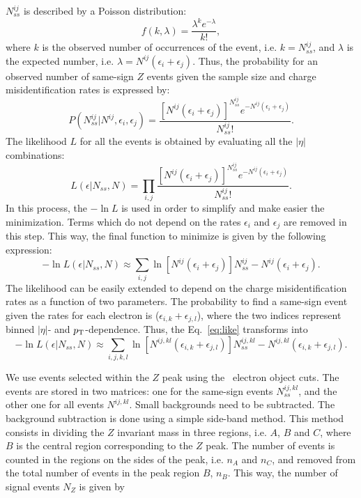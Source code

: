 $N^{ij}_{ss}$ is described by a Poisson distribution:
\begin{equation}
f(k,\lambda)=\frac{\lambda^k e^{-\lambda}}{k!},
\end{equation}
where $k$ is the observed number of occurrences of the event, i.e. $k=N^{ij}_{ss}$, and $\lambda$ is the expected number,  i.e. $\lambda=N^{ij}(\epsilon_i+\epsilon_j)$. Thus, the probability for an observed number of same-sign $Z$ events given the sample size and charge misidentification rates is expressed by:
\begin{equation}
P(N^{ij}_{ss}|N^{ij},\epsilon_i,\epsilon_j)=\frac{[N^{ij}(\epsilon_i+\epsilon_j)]^{N_{ss}^{ij}}e^{-N^{ij}(\epsilon_i+\epsilon_j)}}{N^{ij}_{ss}!}.
\end{equation}
The likelihood $L$ for all the events is obtained by evaluating all the $|\eta|$ combinations:
\begin{equation}
L(\epsilon|N_{ss},N)=\prod_{i,j}\frac{[N^{ij}(\epsilon_i+\epsilon_j)]^{N_{ss}^{ij}}e^{-N^{ij}(\epsilon_i+\epsilon_j)}}{N^{ij}_{ss}!}.
\end{equation}
In this process, the $-\ln L$ is used in order to simplify and make easier the minimization. Terms which do not depend on the rates $\epsilon_i$ and $\epsilon_j$ are removed in this step. This way, the final function to minimize is given by the following expression:
\begin{equation}
\label{eq:like}
-\ln L(\epsilon|N_{ss},N)\approx \sum_{i,j}\ln[N^{ij}(\epsilon_i+\epsilon_j)]N^{ij}_{ss}-N^{ij}(\epsilon_i+\epsilon_j).
\end{equation}
The likelihood can be easily extended to depend on the charge misidentification rates as a function of two parameters. The probability to find a same-sign event given the rates for each electron is ($\epsilon_{i,k}+\epsilon_{j,l}$), where the two indices represent binned $|\eta|$- and $p_{\rm T}$-dependence. Thus, the Eq.~\ref{eq:like} transforms into
\begin{equation}
-\ln L(\epsilon|N_{ss},N)\approx \sum_{i,j,k,l}\ln[N^{ij,kl}(\epsilon_{i,k}+\epsilon_{j,l})]N^{ij,kl}_{ss}-N^{ij,kl}(\epsilon_{i,k}+\epsilon_{j,l}).
\end{equation}   

We use events selected within the $Z$ peak using the \tth\ electron object cuts. The events are stored in two matrices: one for the same-sign events $N^{ij,kl}_{ss}$,  and the other one for all events $N^{ij,kl}$. Small backgrounds need to be subtracted. The background subtraction is done using a simple side-band method.  This method consists in dividing the $Z$ invariant mass in three regions, i.e. $A$, $B$ and $C$, where $B$ is the central region corresponding to the $Z$ peak. The number of events is counted in the regions on the sides of the peak, i.e. $n_A$ and $n_C$, and removed  from the total number of events in the peak region $B$, $n_B$. This way, the number of signal events $N_Z$ is given by

